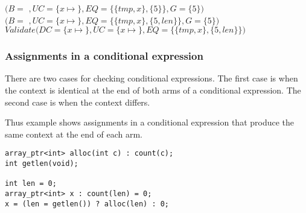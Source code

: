 \begin{small}
\begin{tabbing}
   \>\>\>\>$(B = $ $, UC = \{x\mapsto $$\},
            EQ = \{\{tmp, x\},\{5\}\},  G = \{5\})$\\
   \>\>\>$(B = $ $, UC = \{x\mapsto $$\},
             EQ = \{\{tmp, x\},\{5, len\}\},  G = \{5\})$\\
  \>$Validate(DC = \{x \mapsto$$\},
                   UC = \{x\mapsto $$\},
                   EQ = \{\{tmp, x\},\{5, len\}\})$\\
\end{tabbing}
\end{small}

\subsubsection{Assignments in a conditional expression}

There are two cases for checking conditional expressions. The first case is when the context is identical
at the end of both arms of a conditional expression. The second case is when the context differs.

Thus example shows assignments in a conditional expression that produce the same context at
the end of each arm.
\begin{lstlisting}
array_ptr<int> alloc(int c) : count(c);
int getlen(void);

int len = 0;
array_ptr<int> x : count(len) = 0;
x = (len = getlen()) ? alloc(len) : 0;
\end{lstlisting}

